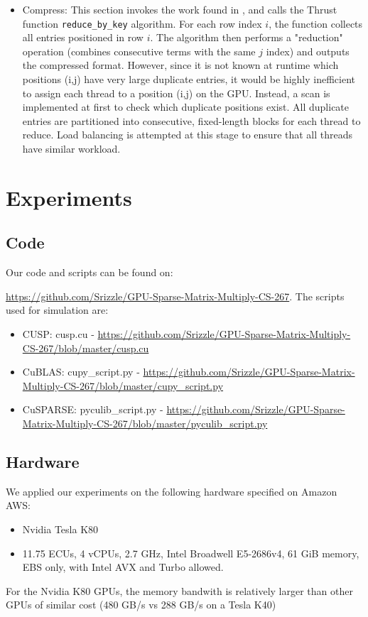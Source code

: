 \documentclass[12pt]{article}
\def\code#1{\texttt{#1}}
\begin{document}
\begin{itemize}
\item Compress: This section invokes the work found in \cite{multigrid}, and calls the Thrust function \code{reduce\_by\_key} algorithm. For each row index $i$, the function collects all entries positioned in row $i$. The algorithm then performs a "reduction" operation (combines consecutive terms with the same $j$ index) and outputs the compressed format. However, since it is not known at runtime which positions (i,j) have very large duplicate entries, it would be highly inefficient to assign each thread to a position (i,j) on the GPU. Instead, a scan is implemented at first to check which duplicate positions exist. All duplicate entries are partitioned into consecutive, fixed-length blocks for each thread to reduce. Load balancing is attempted at this stage to ensure that all threads have similar workload. 
\end{itemize}



\section{Experiments}

\subsection{Code}
\hspace{0.5cm}Our code and scripts can be found on:

\url{https://github.com/Srizzle/GPU-Sparse-Matrix-Multiply-CS-267}. The scripts used for simulation are: 
\begin{itemize}
\item CUSP: cusp.cu - \url{https://github.com/Srizzle/GPU-Sparse-Matrix-Multiply-CS-267/blob/master/cusp.cu}
\item CuBLAS: cupy\_script.py - \url{https://github.com/Srizzle/GPU-Sparse-Matrix-Multiply-CS-267/blob/master/cupy_script.py}
\item CuSPARSE: pyculib\_script.py - \url{https://github.com/Srizzle/GPU-Sparse-Matrix-Multiply-CS-267/blob/master/pyculib_script.py}
\end{itemize}


\subsection{Hardware}
\hspace{0.5cm}We applied our experiments on the following hardware specified on Amazon AWS:
\begin{itemize}
\item Nvidia Tesla K80 
\item 11.75 ECUs, 4 vCPUs, 2.7 GHz, Intel Broadwell E5-2686v4, 61 GiB memory, EBS only, with Intel AVX and Turbo allowed. 
\end{itemize}
For the Nvidia K80 GPUs, the memory bandwith is relatively larger than other GPUs of similar cost (480 GB/s vs 288 GB/s on a Tesla K40) 
\end{document}
